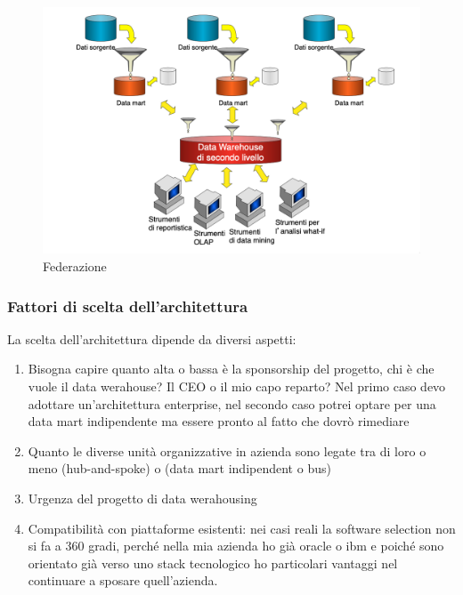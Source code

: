 \begin{itemize}
	\begin{figure}[H]
		\centering
		\includegraphics[width=0.7\linewidth]{img/fede}
		\caption{Federazione}
		\label{fig:federazione}
		
	\end{figure}
\end{itemize}
\subsubsection{Fattori di scelta dell'architettura}
La scelta dell’architettura dipende da diversi aspetti:
\begin{enumerate}
	\item 
	Bisogna capire quanto alta o bassa è la sponsorship del progetto, chi è che vuole il data werahouse? Il CEO o il mio capo reparto? Nel primo caso devo adottare un’architettura enterprise, nel secondo caso potrei optare per una data mart indipendente ma essere pronto al fatto che dovrò rimediare
	\item 
	Quanto le diverse unità organizzative in azienda sono legate tra di loro o meno (hub-and-spoke) o (data mart indipendent o bus)
	\item 
	Urgenza del progetto di data werahousing
	\item 
	Compatibilità con piattaforme esistenti: nei casi reali la software selection non si fa a 360 gradi, perché nella mia azienda ho già oracle o ibm e poiché sono orientato già verso uno stack tecnologico ho particolari vantaggi nel continuare a sposare quell’azienda.
\end{enumerate}